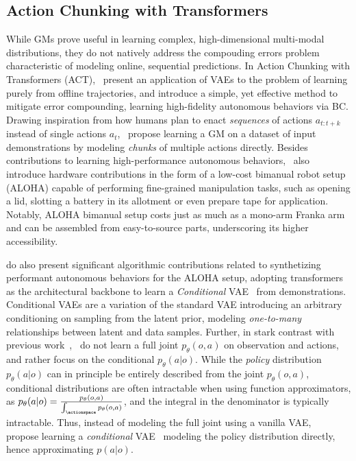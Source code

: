\subsection{Action Chunking with Transformers}
While GMs prove useful in learning complex, high-dimensional multi-modal distributions, they do not natively address the compouding errors problem characteristic of modeling online, sequential predictions.
In Action Chunking with Transformers (ACT),~\citet{zhaoLearningFineGrainedBimanual2023} present an application of VAEs to the problem of learning purely from offline trajectories, and introduce a simple, yet effective method to mitigate error compounding, learning high-fidelity autonomous behaviors via BC.
Drawing inspiration from how humans plan to enact \emph{sequences} of actions \( a_{t:t+k} \) instead of single actions \( a_t \),~\citet{zhaoLearningFineGrainedBimanual2023} propose learning a GM on a dataset of input demonstrations by modeling \emph{chunks} of multiple actions directly.
Besides contributions to learning high-performance autonomous behaviors,~\citet{zhaoLearningFineGrainedBimanual2023} also introduce hardware contributions in the form of a low-cost bimanual robot setup (ALOHA) capable of performing fine-grained manipulation tasks, such as opening a lid, slotting a battery in its allotment or even prepare tape for application.
Notably, ALOHA bimanual setup costs just as much as a mono-arm Franka arm and can be assembled from easy-to-source parts, underscoring its higher accessibility.

\citet{zhaoLearningFineGrainedBimanual2023} do also present significant algorithmic contributions related to synthetizing performant autonomous behaviors for the ALOHA setup, adopting transformers as the architectural backbone to learn a \emph{Conditional} VAE~\citep{sohnLearningStructuredOutput2015} from demonstrations. 
Conditional VAEs are a variation of the standard VAE  introducing an arbitrary conditioning on sampling from the latent prior, modeling \emph{one-to-many} relationships between latent and data samples.
Further, in stark contrast with previous work~\citep{florenceImplicitBehavioralCloning2022,jannerPlanningDiffusionFlexible2022},~\citet{zhaoLearningFineGrainedBimanual2023} do not learn a full joint \( p_\theta(o,a) \) on observation and actions, and rather focus on the conditional \( p_\theta(a \vert o) \).
While the \emph{policy} distribution \( p_\theta(a \vert o) \) can in principle be entirely described from the joint \( p_\theta(o,a) \), conditional distributions are often intractable when using function approximators, as \( p_\theta(a \vert o) = \tfrac{p_\theta(o,a)}{\int_\actionspace p_\theta(o,a)} \), and the integral in the denominator is typically intractable.
Thus, instead of modeling the full joint using a vanilla VAE,~\citet{zhaoLearningFineGrainedBimanual2023} propose learning a \emph{conditional} VAE~\citep{sohnLearningStructuredOutput2015} modeling the policy distribution directly, hence approximating \( p (a \vert o) \).

